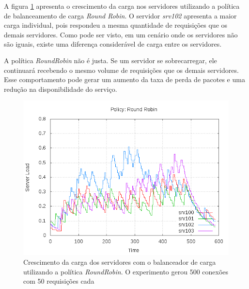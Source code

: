 A figura \ref{fig:balancer-serial-rr} apresenta o crescimento da carga nos 
servidores utilizando a política de balanceamento de carga \emph{Round Robin}.
O servidor \emph{srv102} apresenta a maior carga individual, pois respondeu
a mesma quantidade de requisições que os demais servidores.
Como pode ser visto, em um cenário onde os servidores não são iguais, existe
uma diferença considerável de carga entre os servidores.

A política \emph{RoundRobin} não é justa.
Se um servidor se sobrecarregar, ele continuará recebendo o mesmo volume de 
requisições que os demais servidores.
Esse comportamento pode gerar um aumento da taxa de perda de pacotes e uma 
redução na disponibilidade do serviço.

\begin{figure}[htb!]
    \centering
    \includegraphics[scale=0.5]{img/balancer-serial-rr}
\caption{Crescimento da carga dos servidores com o balanceador de carga 
    utilizando a política \emph{RoundRobin}. O experimento gerou 500 conexões 
        com 50 requisições cada}
    \label{fig:balancer-serial-rr}
\end{figure}


